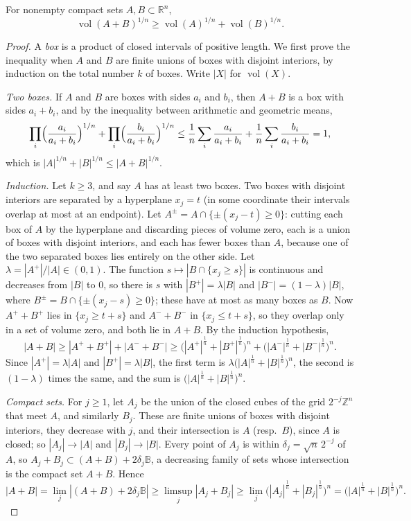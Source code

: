\begin{theorem}\label{geometry:thm:bm}
For nonempty compact sets $A,B\subset\mathbb R^n$,
\[
\operatorname{vol}(A+B)^{1/n}\ge\operatorname{vol}(A)^{1/n}+\operatorname{vol}(B)^{1/n}.
\]
\end{theorem}

\begin{proof}
A \emph{box} is a product of closed intervals of positive length. We first prove the inequality when $A$ and $B$ are finite unions of boxes with disjoint
interiors, by induction on the total number $k$ of boxes. Write $|X|$ for $\operatorname{vol}(X)$.

\emph{Two boxes.} If $A$ and $B$ are boxes with sides $a_i$ and $b_i$, then $A+B$ is a box with sides $a_i+b_i$, and by the inequality between arithmetic and geometric
means,
\[
\prod_i\Bigl(\frac{a_i}{a_i+b_i}\Bigr)^{1/n}+\prod_i\Bigl(\frac{b_i}{a_i+b_i}\Bigr)^{1/n}\le\frac1n\sum_i\frac{a_i}{a_i+b_i}+\frac1n\sum_i\frac{b_i}{a_i+b_i}=1,
\]
which is $|A|^{1/n}+|B|^{1/n}\le|A+B|^{1/n}$.

\emph{Induction.} Let $k\ge3$, and say $A$ has at least two boxes. Two boxes with disjoint interiors are separated by a hyperplane $x_j=t$ (in some coordinate their
intervals overlap at most at an endpoint). Let $A^\pm=A\cap\{\pm(x_j-t)\ge0\}$: cutting each box of $A$ by the hyperplane and discarding pieces of volume zero, each is a union of boxes with disjoint
interiors, and each has fewer boxes than $A$, because one of the two separated boxes lies entirely on the other side. Let $\lambda=|A^+|/|A|\in(0,1)$. The function $s\mapsto|B\cap\{x_j\ge s\}|$ is
continuous and decreases from $|B|$ to $0$, so there is $s$ with $|B^+|=\lambda|B|$ and $|B^-|=(1-\lambda)|B|$, where $B^\pm=B\cap\{\pm(x_j-s)\ge0\}$; these have
at most as many boxes as $B$. Now $A^++B^+$ lies in $\{x_j\ge t+s\}$ and $A^-+B^-$ in $\{x_j\le t+s\}$, so they overlap only in a set of volume zero, and both lie in
$A+B$. By the induction hypothesis,
\[
|A+B|\ge|A^++B^+|+|A^-+B^-|\ge\bigl(|A^+|^{\frac1n}+|B^+|^{\frac1n}\bigr)^n+\bigl(|A^-|^{\frac1n}+|B^-|^{\frac1n}\bigr)^n.
\]
Since $|A^+|=\lambda|A|$ and $|B^+|=\lambda|B|$, the first term is $\lambda\bigl(|A|^{\frac1n}+|B|^{\frac1n}\bigr)^n$, the second is $(1-\lambda)$ times the same, and the
sum is $\bigl(|A|^{\frac1n}+|B|^{\frac1n}\bigr)^n$.

\emph{Compact sets.} For $j\ge1$, let $A_j$ be the union of the closed cubes of the grid $2^{-j}\mathbb Z^n$ that meet $A$, and similarly $B_j$. These are finite
unions of boxes with disjoint interiors, they decrease with $j$, and their intersection is $A$ (resp.\ $B$), since $A$ is closed; so
$|A_j|\to|A|$ and $|B_j|\to|B|$. Every point of $A_j$ is within $\delta_j=\sqrt n\,2^{-j}$ of $A$, so $A_j+B_j\subset(A+B)+2\delta_j\mathbb B$, a decreasing family of
sets whose intersection is the compact set $A+B$. Hence
\[
|A+B|=\lim_j|(A+B)+2\delta_j\mathbb B|\ge\limsup_j|A_j+B_j|\ge\lim_j\bigl(|A_j|^{\frac1n}+|B_j|^{\frac1n}\bigr)^n=\bigl(|A|^{\frac1n}+|B|^{\frac1n}\bigr)^n.
\]
\end{proof}

